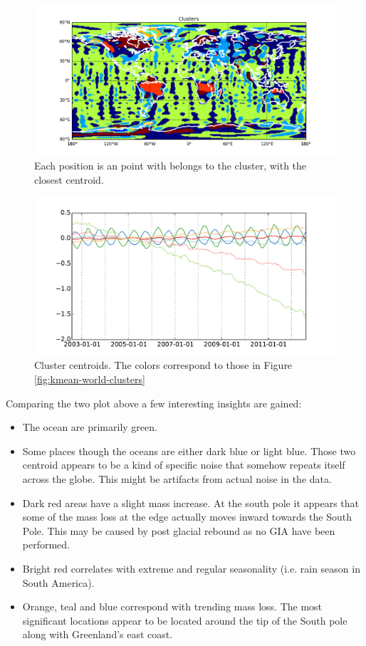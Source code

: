 \begin{figure}[H]
	\center
	\includegraphics[width=\textwidth]{figures/kmeans-world-clusters}
	\caption{Each position is an point with belongs to the cluster, with the closest centroid.}
	\label{fig:kmeans-world-clusters}
\end{figure}
\begin{figure}[H]
	\center
	\includegraphics[width=\textwidth]{figures/kmeans-centroids}
	\caption{Cluster centroids. The colors correspond to those in Figure \ref{fig:kmean-world-clusters}}
	\label{fig:kmeans-centroids}
\end{figure}

Comparing the two plot above a few interesting insights are gained:
\begin{itemize}
 \item The ocean are primarily green.
\item Some places though the oceans are either dark blue or light blue. Those two centroid appears to be a kind of specific noise that somehow repeats itself across the globe. This might be artifacts from actual noise in the data.
\item Dark red areas have a slight mass increase. At the south pole it appears that some of the mass loss at the edge actually moves inward towards the South Pole. This may be caused by post glacial rebound as no GIA have been performed.
\item  Bright red correlates with extreme and regular seasonality (i.e. rain season in South America).
\item Orange, teal and blue correspond with trending mass loss. The most significant locations appear to be located around the tip of the South pole along with Greenland's east coast.
\end{itemize} 
